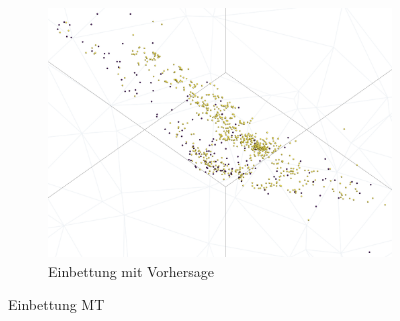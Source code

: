\begin{figure}[h]
		\begin{subfigure}[c]{0.6\textwidth}			
		\includegraphics[width=1\textwidth, center]{bilder/Hauptteil/MT_Grapple/emb_res.png}
		\caption{Einbettung mit Vorhersage}
		\label{img:Emb_MT_Vorhersage}	
	\end{subfigure}
		\caption{Einbettung MT}
		\label{img:EmbeddingMT}
	\end{figure}

